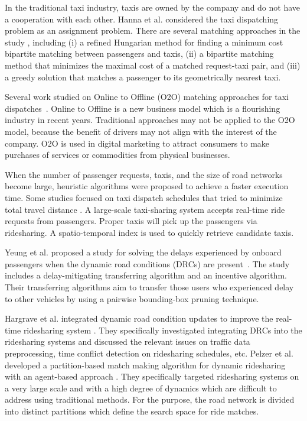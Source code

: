 \documentclass[12pt]{ksthesis}
\begin{document}
\begin{thesis}
{In the traditional taxi industry, taxis are owned by the company and do not have a cooperation with each other. Hanna et al. considered the taxi dispatching problem as an assignment problem. There are several matching approaches in the study \cite{MCMAC}, including (i) a refined Hungarian method for finding a minimum cost bipartite matching between passengers and taxis, (ii) a bipartite matching method that minimizes the maximal cost of a matched request-taxi pair, and (iii) a greedy solution that matches a passenger to its geometrically nearest taxi. 

Several work studied on Online to Offline (O2O) matching approaches for taxi dispatches~\cite{OOBUTDPDMS,OFAAVS,AORSPPSPVS }. Online to Offline is a new business model which is a flourishing industry in recent years. Traditional approaches may not be applied to the O2O model, because the benefit of drivers may not align with the interest of the company. O2O is used in digital marketing to attract consumers to make purchases of services or commodities from physical businesses. 

When the number of passenger requests, taxis, and the size of road networks become large, heuristic algorithms were proposed to achieve a faster execution time. Some studies focused on taxi dispatch schedules that tried to minimize total travel distance \cite{TALSDTRS,RTCTR,CPRIDE}. A large-scale taxi-sharing system accepts real-time ride requests from passengers. Proper taxis will pick up the passengers via ridesharing. A spatio-temporal index is used to quickly retrieve candidate taxis.

Yeung et al. proposed a study for solving the delays experienced by onboard passengers when 
the dynamic road conditions (DRCs)
are present~\cite{AFRTRS}. The study includes a delay-mitigating transferring algorithm and an incentive algorithm. Their transferring algorithms aim to transfer those users who experienced delay to other vehicles by using a pairwise bounding-box pruning technique. 

Hargrave et al. integrated dynamic road condition updates to improve the real-time ridesharing system \cite{IDRCURTRS}. They specifically investigated integrating DRCs into the ridesharing systems and discussed the relevant issues on traffic data preprocessing, time conflict detection on ridesharing schedules, etc. Pelzer et al. developed a partition-based match making algorithm for dynamic ridesharing with an agent-based approach \cite{APBMMADR}. They specifically targeted ridesharing systems on a very large scale and with a high degree of dynamics which are difficult to address using traditional methods. For the purpose, the road network is divided into distinct partitions which define the search space for ride matches. 

}
\end{thesis}
\end{document}
